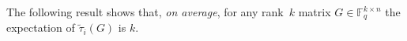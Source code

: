 \documentclass[11pt,a4paper,reqno,twoside]{amsart}
\theoremstyle{definition}
\newtheorem{remark}{Remark}
\newcommand{\F}{\mathbb{F}}
\newcommand{\E}{\mathbb{E}}
\newcommand{\mC}{\mathcal{C}}
\begin{document}
The following result shows that, \emph{on average}, for any rank~$k$ matrix $G \in \F_q^{k \times n}$ the expectation of $\widetilde{\tau}_i(G)$ is $k$.
\end{document}
